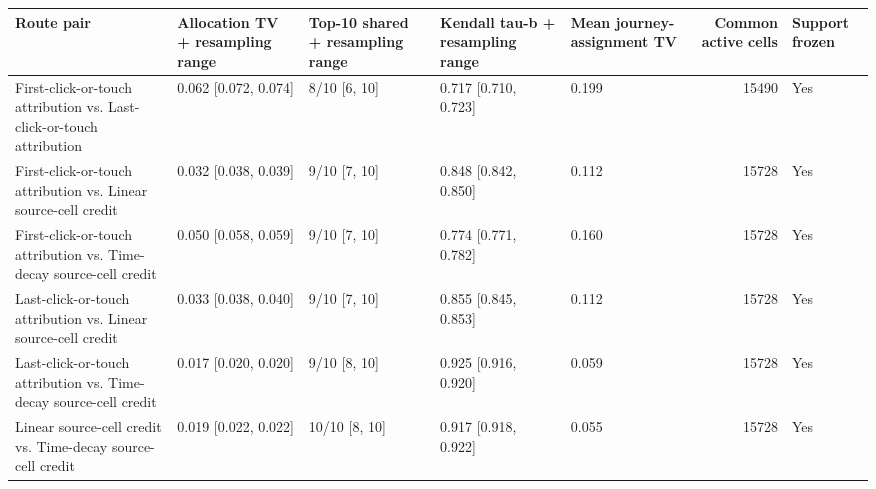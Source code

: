 \begin{tabular}{lllllrl}
\toprule
Route pair & Allocation TV + resampling range & Top-10 shared + resampling range & Kendall tau-b + resampling range & Mean journey-assignment TV & Common active cells & Support frozen \\
\midrule
First-click-or-touch attribution vs. Last-click-or-touch attribution & 0.062 [0.072, 0.074] & 8/10 [6, 10] & 0.717 [0.710, 0.723] & 0.199 & 15490 & Yes \\
First-click-or-touch attribution vs. Linear source-cell credit & 0.032 [0.038, 0.039] & 9/10 [7, 10] & 0.848 [0.842, 0.850] & 0.112 & 15728 & Yes \\
First-click-or-touch attribution vs. Time-decay source-cell credit & 0.050 [0.058, 0.059] & 9/10 [7, 10] & 0.774 [0.771, 0.782] & 0.160 & 15728 & Yes \\
Last-click-or-touch attribution vs. Linear source-cell credit & 0.033 [0.038, 0.040] & 9/10 [7, 10] & 0.855 [0.845, 0.853] & 0.112 & 15728 & Yes \\
Last-click-or-touch attribution vs. Time-decay source-cell credit & 0.017 [0.020, 0.020] & 9/10 [8, 10] & 0.925 [0.916, 0.920] & 0.059 & 15728 & Yes \\
Linear source-cell credit vs. Time-decay source-cell credit & 0.019 [0.022, 0.022] & 10/10 [8, 10] & 0.917 [0.918, 0.922] & 0.055 & 15728 & Yes \\
\bottomrule
\end{tabular}
